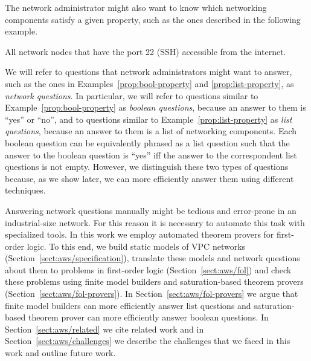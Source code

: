 The network administrator might also want to know which networking components satisfy a given property, such as the ones described in the following example.
\begin{example}\label{prop:list-property}
All network nodes that have the port 22 (SSH) accessible from the internet.
\end{example}

We will refer to questions that network administrators might want to answer, such as the ones in Examples~\ref{prop:bool-property} and \ref{prop:list-property}, as \emph{network questions}. In particular, we will refer to questions similar to Example~\ref{prop:bool-property} as \emph{boolean questions}, because an answer to them is ``yes'' or ``no'', and to questions similar to Example~\ref{prop:list-property} as \emph{list questions}, because an answer to them is a list of networking components. Each boolean question can be equivalently phrased as a list question such that the answer to the boolean question is ``yes'' iff the answer to the correspondent list questions is not empty. However, we distinguish these two types of questions because, as we show later, we can more efficiently answer them using different techniques.

Answering network questions manually might be tedious and error-prone in an industrial-size network. For this reason it is necessary to automate this task with specialized tools. In this work we employ automated theorem provers for first-order logic. To this end, we build static models of VPC networks (Section~\ref{sect:aws/specification}), translate these models and network questions about them to problems in first-order logic (Section~\ref{sect:aws/fol}) and check these problems using finite model builders and saturation-based theorem provers (Section~\ref{sect:aws/fol-provers}). In Section~\ref{sect:aws/fol-provers} we argue that finite model builders can more efficiently answer list questions and saturation-based theorem prover can more efficiently answer boolean questions. In Section~\ref{sect:aws/related} we cite related work and in Section~\ref{sect:aws/challenges} we describe the challenges that we faced in this work and outline future work.


